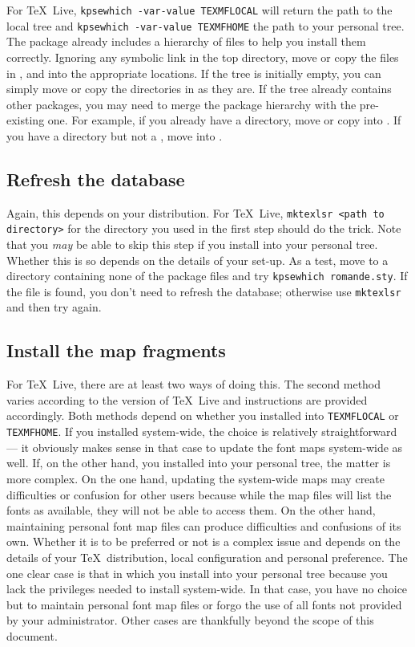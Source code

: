 \documentclass[11pt,british]{article}
\begin{document}
For \TeX~Live, \verb|kpsewhich -var-value TEXMFLOCAL| will return the path to the local tree and \verb|kpsewhich -var-value TEXMFHOME| the path to your personal tree. The package already includes a hierarchy of files to help you install them correctly. Ignoring any symbolic link in the top directory, move or copy the files in ,  and  into the appropriate locations. If the tree is initially empty, you can simply move or copy the directories in as they are. If the tree already contains other packages, you may need to merge the package hierarchy with the pre-existing one. For example, if you already have a  directory, move or copy  into . If you have a  directory but not a , move  into .

\subsection{Refresh the database}

Again, this depends on your distribution. For \TeX~Live, \verb|mktexlsr <path to directory>| for the directory you used in the first step should do the trick. Note that you \emph{may} be able to skip this step if you install into your personal tree. Whether this is so depends on the details of your set-up. As a test, move to a directory containing none of the package files and try \verb|kpsewhich romande.sty|. If the file is found, you don't need to refresh the database; otherwise use \verb|mktexlsr| and then try again.

\subsection{Install the map fragments}

For \TeX~Live, there are at least two ways of doing this. The second method varies according to the version of \TeX~Live and instructions are provided accordingly. Both methods depend on whether you installed into \verb|TEXMFLOCAL| or \verb|TEXMFHOME|. If you installed system-wide, the choice is relatively straightforward --- it obviously makes sense in that case to update the font maps system-wide as well. If, on the other hand, you installed into your personal tree, the matter is more complex. On the one hand, updating the system-wide maps may create difficulties or confusion for other users because while the map files will list the fonts as available, they will not be able to access them. On the other hand, maintaining personal font map files can produce difficulties and confusions of its own. Whether it is to be preferred or not is a complex issue and depends on the details of your \TeX\ distribution, local configuration and personal preference. The one clear case is that in which you install into your personal tree because you lack the privileges needed to install system-wide. In that case, you have no choice but to maintain personal font map files or forgo the use of all fonts not provided by your administrator. Other cases are thankfully beyond the scope of this document.
\end{document}
